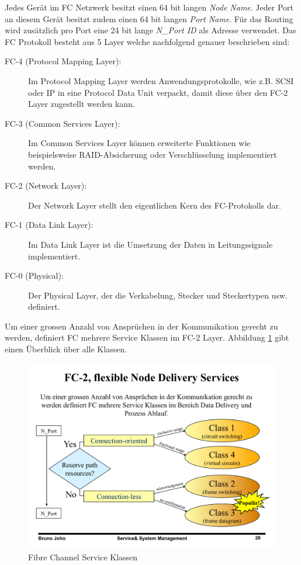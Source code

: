 Jedes Gerät im FC Netzwerk besitzt einen 64 bit langen \emph{Node Name}. Jeder Port an diesem Gerät besitzt zudem einen 64 bit langen \emph{Port Name}. Für das Routing wird zusätzlich pro Port eine 24 bit lange \emph{N\_Port ID} als Adresse verwendet.
Das FC Protokoll besteht aus 5 Layer welche nachfolgend genauer beschrieben sind:
\begin{description}
	\item[FC-4 (Protocol Mapping Layer):] Im Protocol Mapping Layer werden Anwendungsprotokolle, wie z.B. SCSI oder IP in eine Protocol Data Unit verpackt, damit diese über den FC-2 Layer zugestellt werden kann.
	\item[FC-3 (Common Services Layer):] Im Common Services Layer können erweiterte Funktionen wie beispielsweise RAID-Absicherung oder Verschlüsselung implementiert werden.
	\item[FC-2 (Network Layer):] Der Network Layer stellt den eigentlichen Kern des FC-Protokolls dar.
	\item[FC-1 (Data Link Layer):] Im Data Link Layer ist die Umsetzung der Daten in Leitungssignale implementiert.
	\item[FC-0 (Physical):] Der Physical Layer, der die Verkabelung, Stecker und Steckertypen usw. definiert.
\end{description}
Um einer grossen Anzahl von Ansprüchen in der Kommunikation gerecht zu werden, definiert FC mehrere Service Klassen im FC-2 Layer. Abbildung \ref{fig:fc-service-classes} gibt einen Überblick über alle Klassen. 

\begin{figure}
\centering
\includegraphics[width=0.7\linewidth]{fig/fc-service-classes}
\caption{Fibre Channel Service Klassen}
\label{fig:fc-service-classes}
\end{figure}

